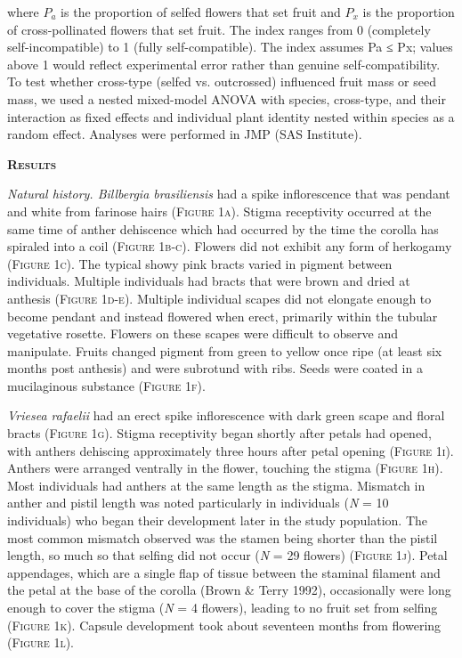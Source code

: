 \documentclass[
]{article}
\begin{document}
where \(P_{a}\) is the proportion of selfed flowers that set fruit and
\(P_{x}\) is the proportion of cross-pollinated flowers that set fruit.
The index ranges from 0 (completely self-incompatible) to 1 (fully
self-compatible). The index assumes Pa ≤ Px; values above 1 would
reflect experimental error rather than genuine self-compatibility. To
test whether cross-type (selfed vs. outcrossed) influenced fruit mass or
seed mass, we used a nested mixed-model ANOVA with species, cross-type,
and their interaction as fixed effects and individual plant identity
nested within species as a random effect. Analyses were performed in JMP
(SAS Institute).

\textbf{\textsc{Results}}

\emph{Natural history. Billbergia brasiliensis} had a spike
inflorescence that was pendant and white from farinose hairs
(\textsc{Figure 1a}). Stigma receptivity occurred at the same time of
anther dehiscence which had occurred by the time the corolla has
spiraled into a coil (\textsc{Figure 1b-c}). Flowers did not exhibit any
form of herkogamy (\textsc{Figure 1c}). The typical showy pink bracts
varied in pigment between individuals. Multiple individuals had bracts
that were brown and dried at anthesis (\textsc{Figure 1d-e}). Multiple
individual scapes did not elongate enough to become pendant and instead
flowered when erect, primarily within the tubular vegetative rosette.
Flowers on these scapes were difficult to observe and manipulate. Fruits
changed pigment from green to yellow once ripe (at least six months post
anthesis) and were subrotund with ribs. Seeds were coated in a
mucilaginous substance (\textsc{Figure 1f}).

\emph{Vriesea rafaelii} had an erect spike inflorescence with dark green
scape and floral bracts (\textsc{Figure 1g}). Stigma receptivity began
shortly after petals had opened, with anthers dehiscing approximately
three hours after petal opening (\textsc{Figure 1i}). Anthers were
arranged ventrally in the flower, touching the stigma (\textsc{Figure
1h}). Most individuals had anthers at the same length as the stigma.
Mismatch in anther and pistil length was noted particularly in
individuals (\emph{N} = 10 individuals) who began their development
later in the study population. The most common mismatch observed was the
stamen being shorter than the pistil length, so much so that selfing did
not occur (\emph{N} = 29 flowers) (\textsc{Figure 1j}). Petal
appendages, which are a single flap of tissue between the staminal
filament and the petal at the base of the corolla (Brown \& Terry 1992),
occasionally were long enough to cover the stigma (\emph{N} = 4
flowers), leading to no fruit set from selfing (\textsc{Figure 1k}).
Capsule development took about seventeen months from flowering
(\textsc{Figure 1l}).
\end{document}
